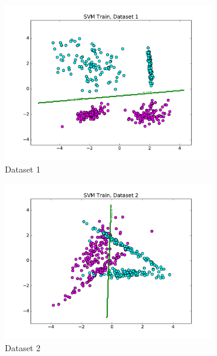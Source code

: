 \documentclass[10pt,psamsfonts]{amsart}
\theoremstyle{definition}
\theoremstyle{remark}
\numberwithin{equation}{section}
\begin{document}
\begin{figure}
	\centering
	\begin{subfigure}[b]{0.23\textwidth}
		\includegraphics[width=\textwidth]{hw2_2-2_1_train.pdf}
		\caption{Dataset 1}
	\end{subfigure}
	\begin{subfigure}[b]{0.23\textwidth}
		\includegraphics[width=\textwidth]{hw2_2-2_2_train.pdf}
		\caption{Dataset 2}
	\end{subfigure}
	\begin{subfigure}[b]{0.23\textwidth}

\end{subfigure}
\end{figure}
\end{document}
